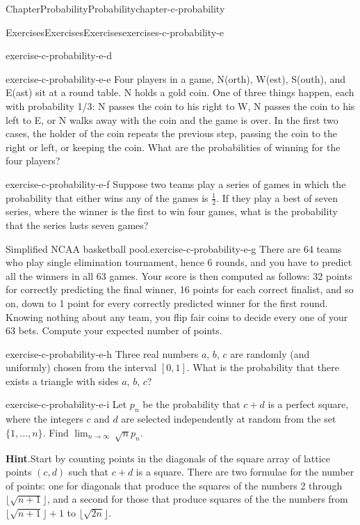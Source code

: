 \documentclass[oneside,10pt,]{book}
\newcommand{\blocktitlefont}{\relax}
\numberwithin{equation}{section}
\begin{document}
\begin{chapterptx}{Chapter}{Probability}{}{Probability}{}{}{chapter-c-probability}
\begin{exercises-section}{Exercises}{Exercises}{}{Exercises}{}{}{exercises-c-probability-e}
\begin{divisionexercise}{3}{}{}{exercise-c-probability-e-d}
\end{divisionexercise}%
\begin{divisionexercise}{4}{}{}{exercise-c-probability-e-e}%
Four players in a game, N(orth), W(est), S(outh), and E(ast) sit at a round table. N holds a gold coin. One of three things happen, each with probability 1\slash{}3: N passes the coin to his right to W, N passes the coin to his left to E, or N walks away with the coin and the game is over. In the first two cases, the holder of the coin repeats the previous step, passing the coin to the right or left, or keeping the coin. What are the probabilities of winning for the four players?%
\end{divisionexercise}%
\begin{divisionexercise}{5}{}{}{exercise-c-probability-e-f}%
Suppose two teams play a series of games in which the probability that either wins any of the games is \(\frac{1}{2}\).  If they play a best of seven series, where the winner is the first to win four games, what is the probability that the series lasts seven games?%
\end{divisionexercise}%
\begin{divisionexercise}{6}{Simplified NCAA basketball pool.}{}{exercise-c-probability-e-g}%
There are 64 teams who play single elimination tournament, hence 6 rounds, and you have to predict all the winners in all 63 games. Your score is then computed as follows: 32 points for correctly predicting the final winner, 16 points for each correct finalist, and so on, down to 1 point for every correctly predicted winner for the first round. Knowing nothing about any team, you flip fair coins to decide every one of your 63 bets. Compute your expected number of points.%
\end{divisionexercise}%
\begin{divisionexercise}{7}{}{}{exercise-c-probability-e-h}%
Three real numbers \(a\), \(b\), \(c\) are randomly (and uniformly) chosen from the interval \([0, 1]\). What is the probability that there exists a triangle with sides \(a\), \(b\), \(c\)?%
\end{divisionexercise}%
\begin{divisionexercise}{8}{}{}{exercise-c-probability-e-i}%
Let \(p_n\) be the probability that \(c + d\) is a perfect square, where the integers \(c\) and \(d\) are selected independently at random from the set \(\{1, . . . , n\}\). Find \(\lim_{n\to \infty } \, \sqrt{n} p_n\).%
\par\smallskip%
\noindent\textbf{\blocktitlefont Hint}.\hypertarget{hint-c-probability-e-i-b}{}\quad{}Start by counting points in the diagonals of the square array of lattice points \((c,d)\) such that \(c+d\) is a square.  There are two formulae for the number of points: one for diagonals that produce the squares of the numbers 2 through \(\lfloor \sqrt{n+1} \rfloor\), and a second for those that produce squares of the the numbers from \(\lfloor \sqrt{n+1} \rfloor +1\) to \(\lfloor \sqrt{2n} \rfloor\).%

\end{divisionexercise}
\end{exercises-section}
\end{chapterptx}
\end{document}
